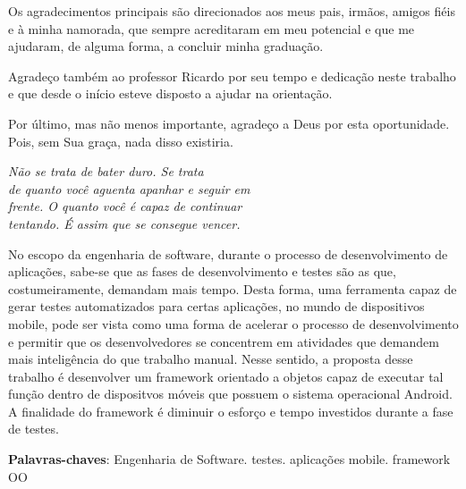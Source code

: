 \documentclass[
    12pt,       %
    openright,      %
    twoside,      %
    a4paper,      %
    english,      %
    french,       %
    spanish,      %
    brazil,       %
    ]{abntex2}
\begin{document}
  \begin{agradecimentos}
  Os agradecimentos principais são direcionados aos meus pais, irmãos,
  amigos fiéis e à minha namorada, que sempre acreditaram em meu potencial
  e que me ajudaram, de alguma forma, a concluir minha graduação.

  Agradeço também ao professor Ricardo por seu tempo e dedicação neste trabalho e que desde o início esteve disposto a ajudar na orientação.

  Por último, mas não menos importante, agradeço a Deus por esta oportunidade. Pois, sem Sua graça, nada disso existiria.

  \end{agradecimentos}

  \begin{epigrafe}
      \vspace*{\fill}
    \begin{flushright}
      \textit{Não se trata de bater duro. Se trata \\
       de quanto você aguenta apanhar e seguir em \\
       frente. O quanto você é capaz de continuar \\
       tentando. É assim que se consegue vencer.}
    \end{flushright}
  \end{epigrafe}


  \begin{resumo}
    No escopo da engenharia de software, durante o processo de desenvolvimento
   de aplicações, sabe-se que as fases de desenvolvimento e testes são as que,
   costumeiramente, demandam mais tempo. Desta forma, uma ferramenta capaz
   de gerar testes automatizados para certas aplicações, no mundo de
   dispositivos mobile, pode ser vista como uma forma de acelerar o processo de
   desenvolvimento e permitir que os desenvolvedores se concentrem em
   atividades que demandem mais inteligência do que trabalho manual. Nesse
   sentido, a proposta desse trabalho é desenvolver um framework orientado
   a objetos capaz de executar tal função dentro de dispositvos móveis
   que possuem o sistema operacional Android. A finalidade do framework é diminuir
   o esforço e tempo investidos durante a fase de testes.

   \vspace{\onelineskip}

   \noindent
   \textbf{Palavras-chaves}: Engenharia de Software. testes. aplicações mobile.
   framework OO
  \end{resumo}
\end{document}
